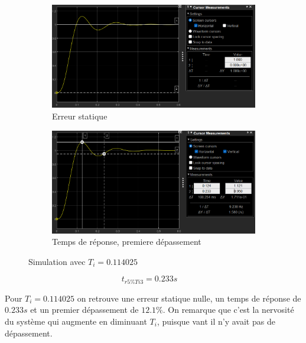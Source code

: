 \documentclass[12pt, a4paper]{report}
\begin{document}
\begin{figure}[H]
    \begin{subfigure}[h!]{0.4\linewidth}
        \includegraphics[width=\linewidth]{sim2ti3errur.png}
        \caption{Erreur statique}
    \end{subfigure}
    \hfill    
    \begin{subfigure}[h!]{0.4\linewidth}
        \includegraphics[width=\linewidth]{sim2ti3deptr.png}
        \caption{Temps de réponse, premiere dépassement}
    \end{subfigure}
    \caption{Simulation avec $T_i = 0.114025$}
    \label{fig:sim2KTi3}
\end{figure}

\[
    t_{r5\%Ti3} = 0.233s \quad
\]

Pour $T_i = 0.114025$ on retrouve une erreur statique nulle, un temps de réponse de $0.233s$ et un premier dépassement de
$12.1\%$. On remarque que c'est la nervosité du système qui augmente en diminuant $T_i$, puisque vant il n'y avait pas de dépassement.
\end{document}
